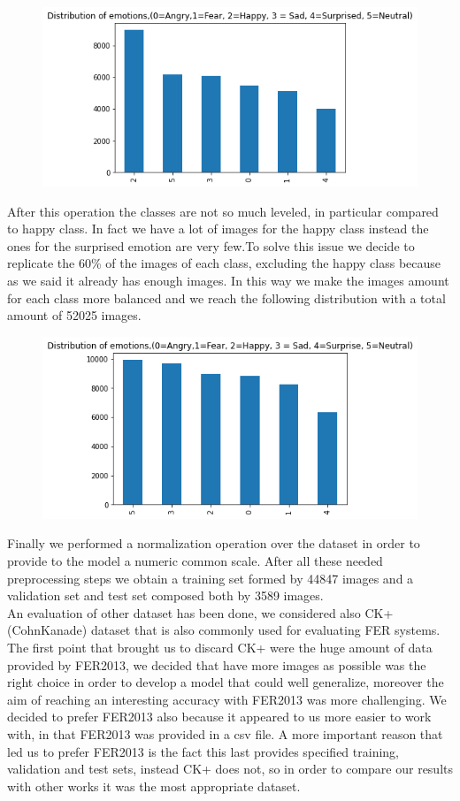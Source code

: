 \documentclass[10pt,twocolumn,letterpaper]{article}
\begin{document}
\begin{figure}[H]
   \centering
   \includegraphics[width=1\linewidth]{./immagini/6_classi.png}
\end{figure}
After this operation the classes are not so much leveled, in particular compared to happy class. In fact we have a lot of images for the happy class instead the ones for the surprised emotion are very few.To solve this issue we decide to replicate the 60\% of the images of each class, excluding the happy class because as we said it already has enough images. In this way we make the images amount for each class more balanced and we reach the following distribution with a total amount of 52025 images.
\begin{figure}[H]
   \centering
   \includegraphics[width=1\linewidth]{./immagini/classi_bilanciate.png}
\end{figure}
Finally we performed a normalization operation over the dataset in order to provide to the model a numeric common scale. After all these needed preprocessing steps we obtain a training set formed by 44847 images and a validation set and test set composed both by 3589 images.\\
An evaluation of other dataset has been done, we considered also CK+ (CohnKanade) dataset that is also commonly used for evaluating FER systems. The first point that brought us to discard CK+ were the huge amount of data provided by FER2013, we decided that have more images as possible was the right choice in order to develop a model that could well generalize, moreover the aim of reaching an interesting accuracy with FER2013 was more challenging. We decided to prefer FER2013 also because it appeared to us more easier to work with, in that FER2013 was provided in a csv file. A more important reason that led us to prefer FER2013 is the fact this last provides specified training, validation and test sets, instead CK+ does not, so in order
to compare our results with other works it was the most appropriate dataset.
\end{document}
